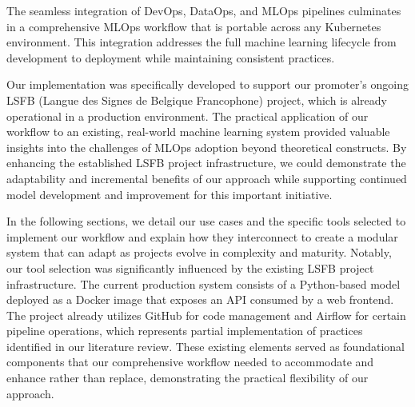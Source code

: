 The seamless integration of DevOps, DataOps, and MLOps pipelines culminates in a comprehensive MLOps workflow that is portable across any Kubernetes environment.
This integration addresses the full machine learning lifecycle from development to deployment while maintaining consistent practices. %

Our implementation was specifically developed to support our promoter's ongoing LSFB (Langue des Signes de Belgique Francophone) project, which is already operational in a production environment.
The practical application of our workflow to an existing, real-world machine learning system provided valuable insights into the challenges of MLOps adoption beyond theoretical constructs.
By enhancing the established LSFB project infrastructure, we could demonstrate the adaptability and incremental benefits of our approach while supporting continued model development and improvement for this important initiative.

In the following sections, we detail our use cases and the specific tools selected to implement our workflow and explain how they interconnect to create a modular system that can adapt as projects evolve in complexity and maturity.
Notably, our tool selection was significantly influenced by the existing LSFB project infrastructure.
The current production system consists of a Python-based model deployed as a Docker image that exposes an API consumed by a web frontend.
The project already utilizes GitHub for code management and Airflow for certain pipeline operations, which represents partial implementation of practices identified in our literature review.
These existing elements served as foundational components that our comprehensive workflow needed to accommodate and enhance rather than replace, demonstrating the practical flexibility of our approach.









